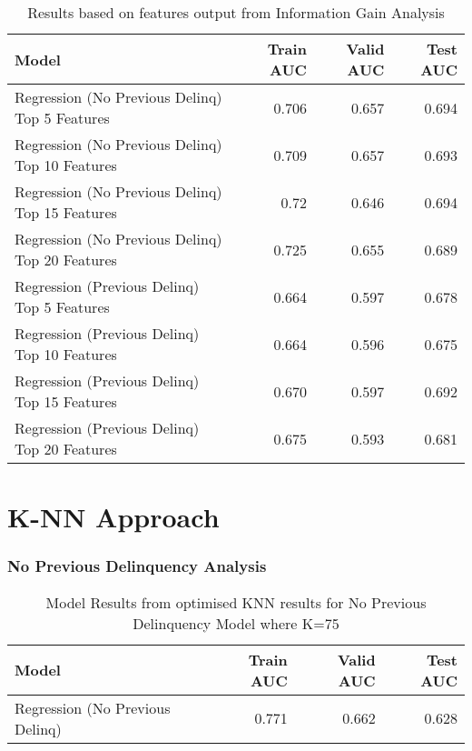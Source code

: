 \begin{table}[H]
	\centering
	\resizebox{\textwidth}{!}
	{
		\begin{tabular}{l | r | r| r}
			\hline
			\textbf{Model} & \textbf{Train AUC} & \textbf{Valid AUC} &  \textbf{Test AUC} \\
			\hline
			Regression (No Previous Delinq) Top 5 Features & 0.706 & 0.657 & 0.694  \\
			Regression (No Previous Delinq) Top 10 Features & 0.709 & 0.657 & 0.693  \\
			Regression (No Previous Delinq) Top 15 Features & 0.72 & 0.646 & 0.694  \\
			Regression (No Previous Delinq) Top 20 Features & 0.725 & 0.655 & 0.689  \\
			\hline
			
			Regression (Previous Delinq) Top 5 Features &  0.664 &  0.597 &  0.678  \\
			Regression (Previous Delinq) Top 10 Features &  0.664 &  0.596 &  0.675  \\
			Regression (Previous Delinq) Top 15 Features &  0.670 &  0.597 &  0.692  \\
			Regression (Previous Delinq) Top 20 Features &  0.675 &  0.593 &  0.681  \\		
			\hline
		\end{tabular}
	}
	\caption{Results based on features output from Information Gain Analysis}
	\label{table:featureselection_base_model}
\end{table}

\section{K-NN Approach}

\subsubsection{No Previous Delinquency Analysis}




\begin{table}[H]
	\centering
	\begin{tabular}{l | r | r| r}
		\hline
		\textbf{Model} & \textbf{Train AUC} & \textbf{Valid AUC} &  \textbf{Test AUC} \\
		\hline
		Regression (No Previous Delinq) & 0.771 & 0.662 & 0.628  \\
		\hline
	\end{tabular}
	\caption{Model Results from optimised KNN results for No Previous Delinquency Model where K=75}
	\label{table:knnNoPrevDelinqModel}
\end{table}



